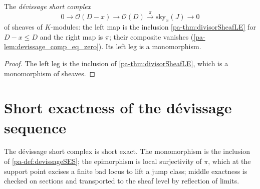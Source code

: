 \begin{definition}
  \label{pa-def:devissageSES}
  \leanok

  The \emph{dévissage short complex}
  \[
    0 \longrightarrow \mathcal O(D-x) \longrightarrow \mathcal O(D)
      \xrightarrow{\ \pi\ } \mathrm{sky}_x(J) \longrightarrow 0
  \]
  of sheaves of \(K\)-modules: the left map is the inclusion \ref{pa-thm:divisorSheafLE} for
  \(D - x \le D\) and the right map is \(\pi\); their composite vanishes
  (\ref{pa-lem:devissage_comp_eq_zero}). Its left leg is a monomorphism.
\end{definition}
\begin{proof}
  \leanok
  The left leg is the inclusion of \ref{pa-thm:divisorSheafLE}, which is a monomorphism of sheaves.
\end{proof}

\section{Short exactness of the dévissage sequence}

The dévissage short complex is short exact. The monomorphism is the inclusion of
\ref{pa-def:devissageSES}; the epimorphism is local surjectivity of \(\pi\), which at the support point
excises a finite bad locus to lift a jump class; middle exactness is checked on sections and
transported to the sheaf level by reflection of limits.

